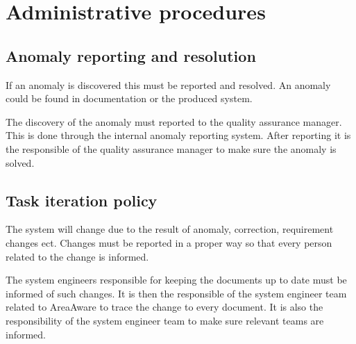 \label{chp:testProcedure}
\chapter{Administrative procedures}

\section{Anomaly reporting and resolution}
If an anomaly is discovered this must be reported and resolved. An anomaly could be found in documentation or the produced system.

The discovery of the anomaly must reported to the quality assurance manager. This is done through the internal anomaly reporting system. After reporting it is the responsible of the quality assurance manager to make sure the anomaly is solved.

\section{Task iteration policy}
The system will change due to the result of anomaly, correction, requirement changes ect. Changes must be reported in a proper way so that every person related to the change is informed.

The system engineers responsible for keeping the documents up to date must be informed of such changes. It is then the responsible of the system engineer team related to AreaAware to trace the change to every document. It is also the responsibility of the system engineer team to make sure relevant teams are informed.